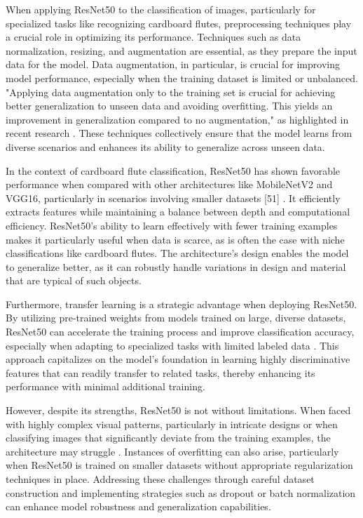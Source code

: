 When applying ResNet50 to the classification of images, particularly for specialized tasks like recognizing cardboard flutes, preprocessing techniques play a crucial role in optimizing its performance. Techniques such as data normalization, resizing, and augmentation are essential, as they prepare the input data for the model. Data augmentation, in particular, is crucial for improving model performance, especially when the training dataset is limited or unbalanced. "Applying data augmentation only to the training set is crucial for achieving better generalization to unseen data and avoiding overfitting. This yields an improvement in generalization compared to no augmentation," as highlighted in recent research \cite{krizhevsky2012imagenet}. These techniques collectively ensure that the model learns from diverse scenarios and enhances its ability to generalize across unseen data.



In the context of cardboard flute classification, ResNet50 has shown favorable performance when compared with other architectures like MobileNetV2 and VGG16, particularly in scenarios involving smaller datasets [51] \cite{sandler2018mobilenetv2}. It efficiently extracts features while maintaining a balance between depth and computational efficiency. ResNet50's ability to learn effectively with fewer training examples makes it particularly useful when data is scarce, as is often the case with niche classifications like cardboard flutes. The architecture's design enables the model to generalize better, as it can robustly handle variations in design and material that are typical of such objects.


Furthermore, transfer learning is a strategic advantage when deploying ResNet50. By utilizing pre-trained weights from models trained on large, diverse datasets, ResNet50 can accelerate the training process and improve classification accuracy, especially when adapting to specialized tasks with limited labeled data \cite{yosinski2014transferable}. This approach capitalizes on the model's foundation in learning highly discriminative features that can readily transfer to related tasks, thereby enhancing its performance with minimal additional training.


However, despite its strengths, ResNet50 is not without limitations. When faced with highly complex visual patterns, particularly in intricate designs or when classifying images that significantly deviate from the training examples, the architecture may struggle \cite{srivastava2014dropout}. Instances of overfitting can also arise, particularly when ResNet50 is trained on smaller datasets without appropriate regularization techniques in place. Addressing these challenges through careful dataset construction and implementing strategies such as dropout or batch normalization can enhance model robustness and generalization capabilities.


